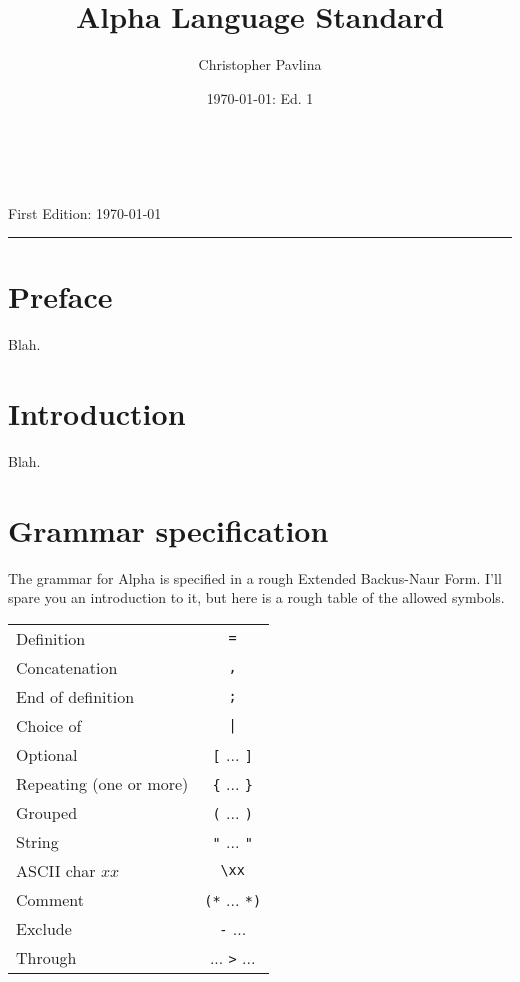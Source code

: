 \documentclass{article}
\title{Alpha Language Standard}
\author{Christopher Pavlina}
\date{\isodate\today: Ed. 1} %
\begin{document}
\makeatletter
\thispagestyle{empty}
\begin{center}
\huge{\@title} \\
\Large{\@author} \\
\large{First Edition: \today}
\end{center}
\hrule
\tableofcontents
\newpage

{}
\section*{Preface}
\label{sec:preface}
Blah.

\section{Introduction}
\label{sec:intro}
Blah.

\section{Grammar specification}
\label{sec:grammar}
The grammar for Alpha is specified in a rough Extended Backus-Naur Form. I'll
spare you an introduction to it, but here is a rough table of the allowed
symbols.

\begin{tabular}{|l|c|}
\hline
Definition & \texttt{=} \\
Concatenation & \texttt{,} \\
End of definition & \texttt{;} \\
Choice of & \texttt{|} \\
Optional & \texttt{[} ... \texttt{]} \\
Repeating (one or more) & \texttt{\{} ... \texttt{\}} \\
Grouped & \texttt{(} ... \texttt{)} \\
String & \texttt{"} ... \texttt{"} \\
ASCII char $xx$ & \texttt{\textbackslash xx} \\
Comment & \texttt{(*} ... \texttt{*)} \\
Exclude & \texttt{-} ... \\
Through & ... \texttt{>} ... \\
\hline
\end{tabular}
\end{document}
